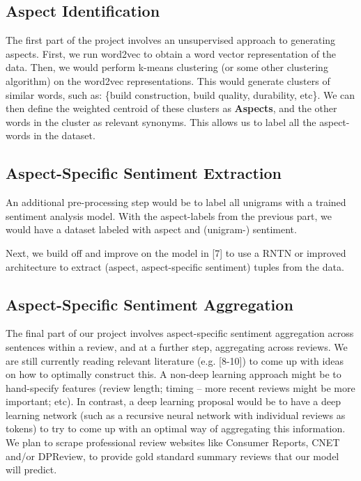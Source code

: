 \documentclass{article} %
\begin{document}
\subsection{Aspect Identification}

The first part of the project involves an unsupervised approach to generating aspects. First, we run word2vec to obtain a word vector representation of the data. Then, we would perform k-means clustering (or some other clustering algorithm) on the word2vec representations. This would generate clusters of similar words, such as: \{build construction, build quality, durability, etc\}. We can then define the weighted centroid of these clusters as {\bf Aspects}, and the other words in the cluster as relevant synonyms. This allows us to label all the aspect-words in the dataset.




\subsection{Aspect-Specific Sentiment Extraction}

An additional pre-processing step would be to label all unigrams with a trained sentiment analysis model. With the aspect-labels from the previous part, we would have a dataset labeled with aspect and (unigram-) sentiment.

Next, we build off and improve on the model in [7] to use a RNTN or improved architecture to extract (aspect, aspect-specific sentiment) tuples from the data.


\subsection{Aspect-Specific Sentiment Aggregation}

The final part of our project involves aspect-specific sentiment aggregation across sentences within a review, and at a further step, aggregating across reviews. We are still currently reading relevant literature (e.g. [8-10]) to come up with ideas on how to optimally construct this. A non-deep learning approach might be to hand-specify features (review length; timing -- more recent reviews might be more important; etc). In contrast, a deep learning proposal would be to have a deep learning network (such as a recursive neural network with individual reviews as tokens) to try to come up with an optimal way of aggregating this information. We plan to scrape professional review websites like Consumer Reports, CNET and/or DPReview, to provide gold standard summary reviews that our model will predict.
\end{document}
